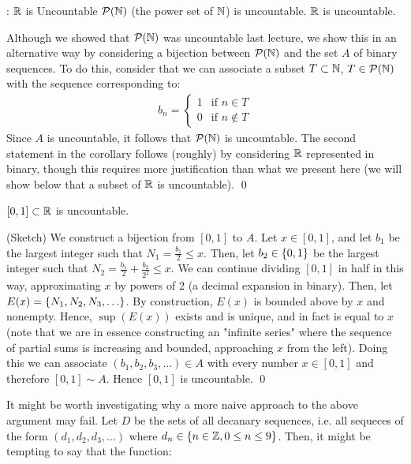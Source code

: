 \begin{ncorollary}{: $\mathbb{R}$ is Uncountable}{}
    $\mathcal{P}(\mathbb{N})$ (the power set of $\mathbb{N}$) is uncountable. $\mathbb{R}$ is uncountable.
\end{ncorollary}
\begin{nproof}
    Although we showed that $\mathcal{P}(\mathbb{N})$ was uncountable last lecture, we show this in an alternative way by considering a bijection between $\mathcal{P}(\mathbb{N})$ and the set $A$ of binary sequences. To do this, consider that we can associate a subset $T \subset \mathbb{N}$, $T \in \mathcal{P}(\mathbb{N})$ with the sequence corresponding to:
    \begin{align*}
        b_n = \begin{cases}
            1 & \text{if $n \in T$}
            \\ 0 & \text{if $n \notin T$}
        \end{cases}
    \end{align*}
    Since $A$ is uncountable, it follows that $\mathcal{P}(\mathbb{N})$ is uncountable. The second statement in the corollary follows (roughly) by considering $\mathbb{R}$ represented in binary, though this requires more justification than what we present here (we will show below that a subset of $\mathbb{R}$ is uncountable). \qed
\end{nproof}
\begin{ntheorem}{}{}
    $[0, 1] \subset \mathbb{R}$ is uncountable.
\end{ntheorem}
\begin{nproof}
    (Sketch) We construct a bijection from $[0, 1]$ to $A$. Let $x \in [0,1]$, and let $b_1$ be the largest integer such that $N_1 = \frac{b_1}{2} \leq x$. Then, let $b_2 \in \set{0, 1}$ be the largest integer such that $N_2 = \frac{b_1}{2} + \frac{b_2}{2^2} \leq x$. We can continue dividing $[0,1]$ in half in this way, approximating $x$ by powers of 2 (a decimal expansion in binary). Then, let $E(x) = \set{N_1, N_2, N_3, \ldots}$. By construction, $E(x)$ is bounded above by $x$ and nonempty. Hence, $\sup(E(x))$ exists and is unique, and in fact is equal to $x$ (note that we are in essence constructing an "infinite series" where the sequence of partial sums is increasing and bounded, approaching $x$ from the left). Doing this we can associate $(b_1, b_2, b_3, \ldots) \in A$ with every number $x \in [0, 1]$ and therefore $[0, 1] \sim A$. Hence $[0, 1]$ is uncountable. \qed
\end{nproof}
\noindent It might be worth investigating why a more naive approach to the above argument may fail. Let $D$ be the sets of all decanary sequences, i.e. all sequeces of the form $(d_1, d_2, d_3, \ldots)$ where $d_n \in \set{n \in \mathbb{Z}, 0 \leq n \leq 9}$. Then, it might be tempting to say that the function:
